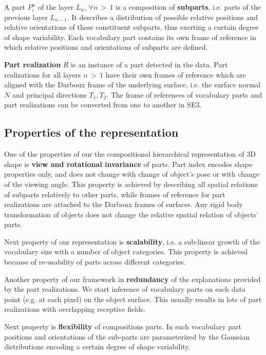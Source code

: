 \documentclass[runningheads]{llncs}
\begin{document}
A part $P_{i}^n$ of the layer $L_n$, $\forall n\,{>}\,1$ is a
composition of \textbf{subparts}, i.e. parts of the previous layer
$L_{n-1}$. It describes a distribution of possible relative
positions and relative orientations of these constituent subparts,
thus exerting a curtain degree of shape variability. Each vocabulary
part contains its own frame of reference in which relative positions
and orientations of subparts are defined.

\textbf{Part realization} $R$ is an instance of a part detected in
the data. Part realizations for all layers $n\,{>}\,1$ have their
own frames of reference which are aligned with the Darboux frame of
the underlying surface, i.e. the surface normal $N$ and principal
directions $T_1, T_2$. The frame of references of vocabulary parts
and part realizations can be converted from one to another in SE3.

\subsection{Properties of the representation\label{sec:Properties}}

One of the properties of our the compositional hierarchical
representation of 3D shape is \textbf{view and rotational
invariance} of parts. Part index encodes shape properties only, and
does not change with change of object's pose or with change of the
viewing angle. This property is achieved by describing all spatial
relations of subparts relatively to other parts, while frames of
reference for part realizations are attached to the Darboux frames
of surfaces. Any rigid body transformation of objects does not
change the relative spatial relation of objects' parts.

Next property of our representation is \textbf{scalability}, i.e. a
sub-linear growth of the vocabulary size with a number of object
categories. This property is achieved because of re-usability of
parts across different categories.

Another property of our framework in \textbf{redundancy} of the
explanations provided by the part realizations. We start inference
of vocabulary parts on each data point (e.g. at each pixel) on the
object surface. This usually results in lots of part realizations
with overlapping receptive fields.

Next property is \textbf{flexibility} of compositions parts. In each
vocabulary part positions and orientations of the sub-parts are
parameterized by the Gaussian distributions encoding a certain
degree of shape variability.
\end{document}

